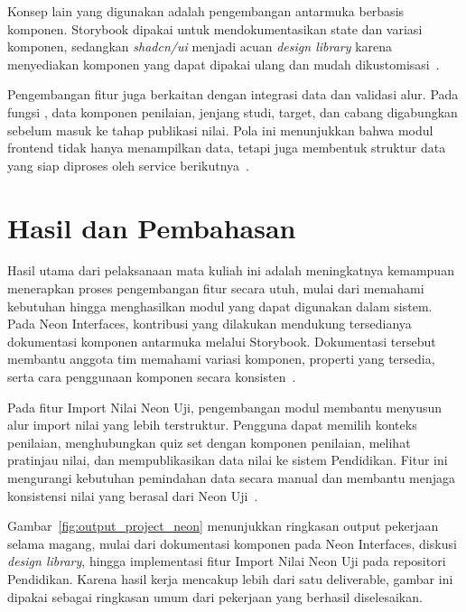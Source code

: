 Konsep lain yang digunakan adalah pengembangan antarmuka berbasis komponen. Storybook dipakai untuk mendokumentasikan state dan variasi komponen, sedangkan \textit{shadcn/ui} menjadi acuan \textit{design library} karena menyediakan komponen yang dapat dipakai ulang dan mudah dikustomisasi~\cite{storybook_docs,shadcn_ui}.

Pengembangan fitur juga berkaitan dengan integrasi data dan validasi alur. Pada fungsi , data komponen penilaian, jenjang studi, target, dan cabang digabungkan sebelum masuk ke tahap publikasi nilai. Pola ini menunjukkan bahwa modul frontend tidak hanya menampilkan data, tetapi juga membentuk struktur data yang siap diproses oleh service berikutnya~\cite{pendidikan_useImportNeonUji_composable,pendidikan_import_neon_uji_services}.

\section{Hasil dan Pembahasan}
Hasil utama dari pelaksanaan mata kuliah ini adalah meningkatnya kemampuan menerapkan proses pengembangan fitur secara utuh, mulai dari memahami kebutuhan hingga menghasilkan modul yang dapat digunakan dalam sistem. Pada Neon Interfaces, kontribusi yang dilakukan mendukung tersedianya dokumentasi komponen antarmuka melalui Storybook. Dokumentasi tersebut membantu anggota tim memahami variasi komponen, properti yang tersedia, serta cara penggunaan komponen secara konsisten~\cite{storybook_docs,shadcn_ui}.

Pada fitur Import Nilai Neon Uji, pengembangan modul membantu menyusun alur import nilai yang lebih terstruktur. Pengguna dapat memilih konteks penilaian, menghubungkan quiz set dengan komponen penilaian, melihat pratinjau nilai, dan mempublikasikan data nilai ke sistem Pendidikan. Fitur ini mengurangi kebutuhan pemindahan data secara manual dan membantu menjaga konsistensi nilai yang berasal dari Neon Uji~\cite{pendidikan_useImportNeonUji_composable,pendidikan_import_neon_uji_component,pendidikan_import_neon_uji_services}.

Gambar~\ref{fig:output_project_neon} menunjukkan ringkasan output pekerjaan selama magang, mulai dari dokumentasi komponen pada Neon Interfaces, diskusi \textit{design library}, hingga implementasi fitur Import Nilai Neon Uji pada repositori Pendidikan. Karena hasil kerja mencakup lebih dari satu deliverable, gambar ini dipakai sebagai ringkasan umum dari pekerjaan yang berhasil diselesaikan.

